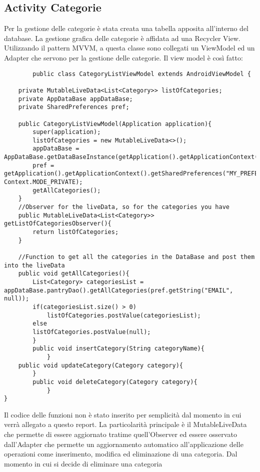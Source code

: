 \documentclass[11pt]{article}
\begin{document}
    \subsection{Activity Categorie}
    Per la gestione delle categorie è stata creata una tabella apposita all'interno del database. La gestione grafica delle 
    categorie è affidata ad una Recycler View. Utilizzando il pattern MVVM, a questa classe sono collegati un ViewModel ed un 
    Adapter che servono per la gestione delle categorie.
    Il view model è così fatto:
    \begin{lstlisting}
        public class CategoryListViewModel extends AndroidViewModel {

    private MutableLiveData<List<Category>> listOfCategories;
    private AppDataBase appDataBase;
    private SharedPreferences pref;

    public CategoryListViewModel(Application application){
        super(application);
        listOfCategories = new MutableLiveData<>();
        appDataBase = AppDataBase.getDataBaseInstance(getApplication().getApplicationContext());
        pref = getApplication().getApplicationContext().getSharedPreferences("MY_PREFERENCES", Context.MODE_PRIVATE);
        getAllCategories();
    }
    //Observer for the liveData, so for the categories you have
    public MutableLiveData<List<Category>> getListOfCategoriesObserver(){
        return listOfCategories;
    }

    //Function to get all the categories in the DataBase and post them into the liveData
    public void getAllCategories(){
        List<Category> categoriesList = appDataBase.pantryDao().getAllCategories(pref.getString("EMAIL", null));
        if(categoriesList.size() > 0)
            listOfCategories.postValue(categoriesList);
        else
        listOfCategories.postValue(null);
        }
        public void insertCategory(String categoryName){    
            }
    public void updateCategory(Category category){    
        }
        public void deleteCategory(Category category){  
            }
}
\end{lstlisting}
Il codice delle funzioni non è stato inserito per semplicità dal momento in cui verrà allegato a questo report.
La particolarità principale è il MutableLiveData che permette di essere aggiornato tratime quell'Observer
ed essere osservato dall'Adapter che permette un aggiornamento automatico all'applicazione delle operazioni
come inserimento, modifica ed eliminazione di una categoria. Dal momento in cui si decide di eliminare una categoria
\end{document}
